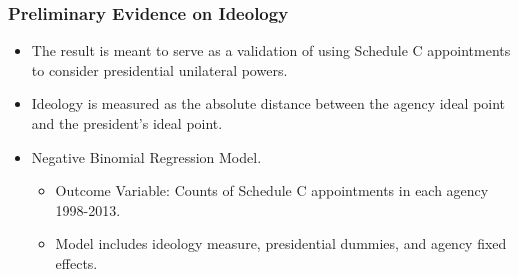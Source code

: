 \documentclass{beamer}
\begin{document}
\begin{frame}
\frametitle{Preliminary Evidence on Ideology}

\begin{itemize}\addtolength{\itemsep}{1.5\baselineskip}
\item The result is meant to serve as a validation of using Schedule C appointments to consider presidential unilateral powers. 
\item Ideology is measured as the absolute distance between the agency ideal point and the president's ideal point.
\item Negative Binomial Regression Model.
\begin{itemize}\addtolength{\itemsep}{1\baselineskip}
\item Outcome Variable: Counts of Schedule C appointments in each agency 1998-2013.
\item Model includes ideology measure, presidential dummies, and agency fixed effects.
\end{itemize}
\end{itemize}
\end{frame}
\end{document}
